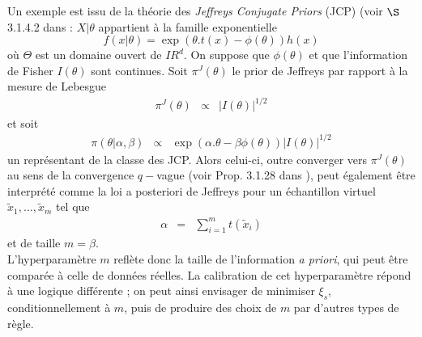 \documentclass[10pt]{article}
\newcommand{\R}{I\!\!R}
\newcommand{\1}{\mathbbm{1}}
\begin{document}
Un exemple est issu de la th\'eorie des {\it Jeffreys Conjugate Priors} (JCP)  (voir $\S$ 3.1.4.2 dans \cite{Bioche2015} : $X|\theta$ appartient \`a la famille exponentielle
$$
f(x|\theta) = \exp(\theta.t(x) - \phi(\theta))h(x)
$$
o\`u $\Theta$ est un domaine ouvert de $\R^d$. On suppose que $\phi(\theta)$ et que l'information de Fisher $I(\theta)$ sont continues. Soit $\pi^J(\theta)$ le prior de Jeffreys par rapport \`a la mesure de Lebesgue 
\begin{eqnarray}
\pi^J(\theta)  & \propto &  \left|I(\theta) \right|^{1/2}
\end{eqnarray}
et soit 
\begin{eqnarray}
\pi(\theta|\alpha,\beta) & \propto & \exp(\alpha.\theta - \beta \phi(\theta)) \left|I(\theta) \right|^{1/2}
\end{eqnarray}
un repr\'esentant de la classe des JCP. Alors celui-ci, outre converger vers $\pi^J(\theta)$ au sens de la convergence $q-$vague (voir Prop. 3.1.28 dans \cite{Bioche2015}), peut \'egalement \^etre interpr\'et\'e comme la loi a posteriori de Jeffreys pour un \'echantillon virtuel $\tilde{x}_1,\ldots,\tilde{x}_m$ tel que 
\begin{eqnarray}
\alpha & = &  \sum\limits_{i=1}^m t(\tilde{x}_i)
\end{eqnarray}
et de taille $m=\beta$. \\

L'hyperparam\`etre $m$ refl\`ete donc la taille de l'information {\it a priori}, qui peut \^etre compar\'ee \`a celle de donn\'ees r\'eelles. La calibration de cet hyperparam\`etre r\'epond \`a une logique diff\'erente ; on peut ainsi envisager de minimiser $\xi_s$, conditionnellement \`a $m$, puis de produire des choix de $m$ par d'autres types de r\`egle. \\





\end{document}
